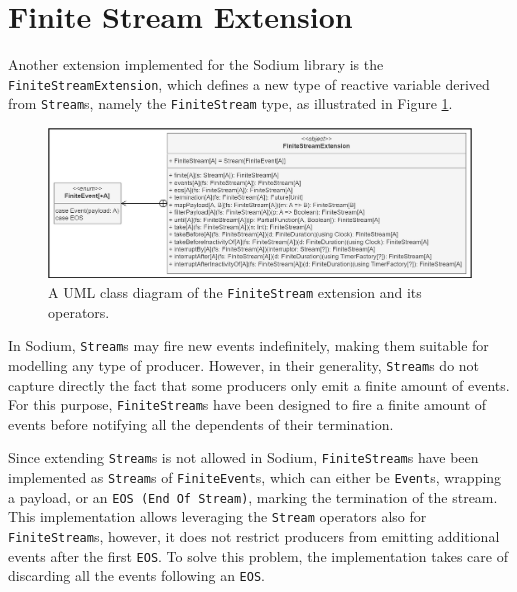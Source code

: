 
\section{Finite Stream Extension}
\label{section:implementation:finite-stream-extension}

Another extension implemented for the Sodium library is the
\texttt{FiniteStreamExten\-sion}, which defines a new type of reactive variable
derived from \texttt{Stream}s, namely the \texttt{Finite\-Stream} type, as
illustrated in Figure \ref{figure:finite-stream-extension-class-diagram}.

\begin{figure}[!ht]
  \centering
  \includegraphics[width=1\textwidth]{resources/figures/finite-stream-extension-class-diagram.png}
  \caption{
    A UML class diagram of the \texttt{FiniteStream} extension
    and its operators.
  }
  \label{figure:finite-stream-extension-class-diagram}
\end{figure}

In Sodium, \texttt{Stream}s may fire new events indefinitely, making them
suitable for modelling any type of producer. However, in their generality,
\texttt{Stream}s do not capture directly the fact that some producers only emit
a finite amount of events. For this purpose, \texttt{FiniteStream}s have been
designed to fire a finite amount of events before notifying all the dependents
of their termination.

Since extending \texttt{Stream}s is not allowed in Sodium,
\texttt{FiniteStream}s have been implemented as \texttt{Stream}s of
\texttt{FiniteEvent}s, which can either be \texttt{Event}s, wrapping a payload,
or an \texttt{EOS (End Of Stream)}, marking the termination of the stream. This
implementation allows leveraging the \texttt{Stream} operators also for
\texttt{FiniteStream}s, however, it does not restrict producers from emitting
additional events after the first \texttt{EOS}. To solve this problem, the
implementation takes care of discarding all the events following an
\texttt{EOS}.

